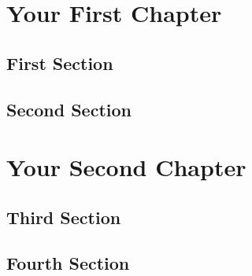 \documentclass[12pt,oneside,openright]{book}
\begin{document}
\chapter{Your First Chapter}
\lipsum[1-5]
\clearpage

\section{First Section}
\lipsum[6-10]
\clearpage

\section{Second Section}
\lipsum[11-15]

\chapter{Your Second Chapter}
\lipsum[16-20]
\clearpage

\section{Third Section}
\lipsum[21-25]
\clearpage

\section{Fourth Section}
\lipsum[26-30]
\end{document}
